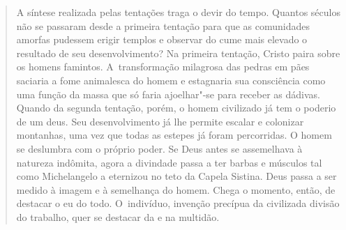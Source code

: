 {\begin{quote}
A síntese realizada pelas tentações traga o devir do tempo. Quantos
séculos não se passaram desde a primeira tentação para que as
comunidades amorfas pudessem erigir templos e observar do cume mais
elevado o resultado de seu desenvolvimento? Na primeira tentação, Cristo
paira sobre os homens famintos. A~transformação milagrosa das pedras em
pães saciaria a fome animalesca do homem e estagnaria sua consciência
como uma função da massa que só faria ajoelhar"-se para receber as
dádivas. Quando da segunda tentação, porém, o homem civilizado já tem o
poderio de um deus. Seu desenvolvimento já lhe permite escalar e
colonizar montanhas, uma vez que todas as estepes já foram percorridas.
O homem se deslumbra com o próprio poder. Se Deus antes se assemelhava à
natureza indômita, agora a divindade passa a ter barbas e músculos tal
como Michelangelo a eternizou no teto da Capela Sistina. Deus passa a
ser medido à imagem e à semelhança do homem. Chega o momento, então, de
destacar o eu do todo. O~indivíduo, invenção precípua da civilizada
divisão do trabalho, quer se destacar da e na multidão.


\end{quote}}
